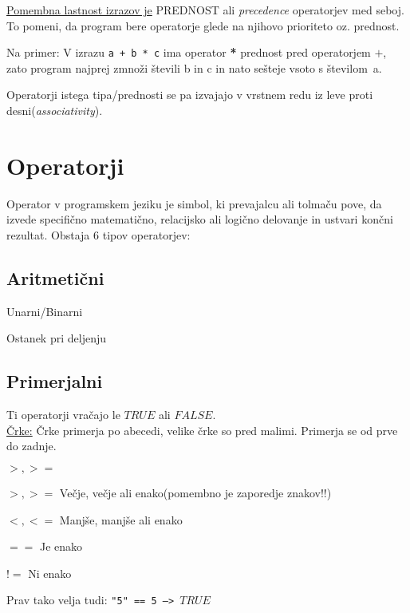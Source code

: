 \underline{Pomembna lastnost izrazov je} PREDNOST ali \textit{precedence} operatorjev med seboj. To pomeni, da program bere operatorje glede na njihovo prioriteto  oz. prednost.\

Na primer: V izrazu \texttt{a + b * c} ima operator \textbf{*} prednost pred operatorjem $+$, zato program najprej zmnoži števili b in c in nato sešteje vsoto s številom~a.\

Operatorji istega tipa/prednosti se pa izvajajo v vrstnem redu iz leve proti desni(\textit{associativity}).

\section{Operatorji}

Operator v programskem jeziku je simbol, ki prevajalcu ali tolmaču pove, da izvede specifično matematično, relacijsko ali logično delovanje in ustvari končni rezultat. Obstaja 6 tipov operatorjev:

\subsection{Aritmetični}

\begin{description}[align=left,labelwidth=3cm]
	\item[$+, -$] Unarni/Binarni
	\item[$\times, \div$]
	\item[$\%$] Ostanek pri deljenju
\end{description}

\subsection{Primerjalni}
Ti operatorji vračajo le $TRUE$ ali $FALSE$.\\
\underline{Črke:}
Črke primerja po abecedi, velike črke so pred malimi. Primerja se od prve do zadnje.

\begin{labeling}{$>, >=$}
	\item [$>, >=$]	Večje, večje ali enako(pomembno je zaporedje znakov!!)
	\item [$<, <=$]	Manjše, manjše ali enako
	\item [$==$] Je enako	
	\item [$!=$] Ni enako
\end{labeling} 

Prav tako velja tudi: \texttt{"5"~==~5 --> $TRUE$}


